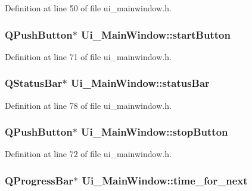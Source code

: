 Definition at line 50 of file ui\_\-mainwindow.h.

\hypertarget{classUi__MainWindow_a58a84cd3057ab5459819f986b08942b1}{
\subsubsection[{startButton}]{\setlength{\rightskip}{0pt plus 5cm}QPushButton$\ast$ {\bf Ui\_\-MainWindow::startButton}}}
\label{classUi__MainWindow_a58a84cd3057ab5459819f986b08942b1}


Definition at line 71 of file ui\_\-mainwindow.h.

\hypertarget{classUi__MainWindow_a50fa481337604bcc8bf68de18ab16ecd}{
\subsubsection[{statusBar}]{\setlength{\rightskip}{0pt plus 5cm}QStatusBar$\ast$ {\bf Ui\_\-MainWindow::statusBar}}}
\label{classUi__MainWindow_a50fa481337604bcc8bf68de18ab16ecd}


Definition at line 78 of file ui\_\-mainwindow.h.

\hypertarget{classUi__MainWindow_a32791e01697a0fa4c2e5219b2d717a95}{
\subsubsection[{stopButton}]{\setlength{\rightskip}{0pt plus 5cm}QPushButton$\ast$ {\bf Ui\_\-MainWindow::stopButton}}}
\label{classUi__MainWindow_a32791e01697a0fa4c2e5219b2d717a95}


Definition at line 72 of file ui\_\-mainwindow.h.

\hypertarget{classUi__MainWindow_ad200a2549a1067eff25bb476691c6555}{
\subsubsection[{time\_\-for\_\-next}]{\setlength{\rightskip}{0pt plus 5cm}QProgressBar$\ast$ {\bf Ui\_\-MainWindow::time\_\-for\_\-next}}}
\label{classUi__MainWindow_ad200a2549a1067eff25bb476691c6555}


